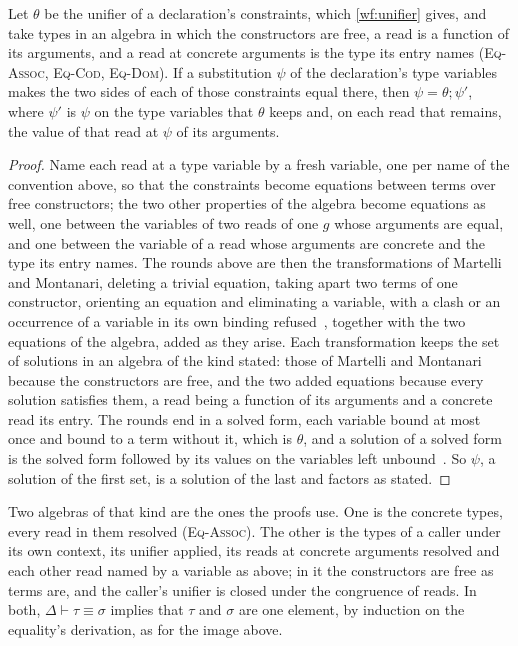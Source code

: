 \begin{lemma}[Factoring]
\label{lem:factor}
Let $\theta$ be the unifier of a declaration's  constraints, which \ref{wf:unifier} gives, and take types in an algebra in which the constructors are free, a read is a function of its arguments, and a read at concrete arguments is the type its entry names (\textsc{Eq-Assoc}, \textsc{Eq-Cod}, \textsc{Eq-Dom}).
If a substitution $\psi$ of the declaration's type variables makes the two sides of each of those constraints equal there, then $\psi = \theta;\psi'$, where $\psi'$ is $\psi$ on the type variables that $\theta$ keeps and, on each read that remains, the value of that read at $\psi$ of its arguments.
\end{lemma}
\begin{proof}
Name each read at a type variable by a fresh variable, one per name of the convention above, so that the constraints become equations between terms over free constructors; the two other properties of the algebra become equations as well, one between the variables of two reads of one $g$ whose arguments are equal, and one between the variable of a read whose arguments are concrete and the type its entry names.
The rounds above are then the transformations of Martelli and Montanari, deleting a trivial equation, taking apart two terms of one constructor, orienting an equation and eliminating a variable, with a clash or an occurrence of a variable in its own binding refused~\cite{martelli1982efficient,baader2001unification}, together with the two equations of the algebra, added as they arise.
Each transformation keeps the set of solutions in an algebra of the kind stated: those of Martelli and Montanari because the constructors are free, and the two added equations because every solution satisfies them, a read being a function of its arguments and a concrete read its entry.
The rounds end in a solved form, each variable bound at most once and bound to a term without it, which is $\theta$, and a solution of a solved form is the solved form followed by its values on the variables left unbound~\cite[Chapter~4]{baader1998term}.
So $\psi$, a solution of the first set, is a solution of the last and factors as stated.
\end{proof}

Two algebras of that kind are the ones the proofs use.
One is the concrete types, every read in them resolved (\textsc{Eq-Assoc}).
The other is the types of a caller under its own context, its unifier applied, its reads at concrete arguments resolved and each other read named by a variable as above; in it the constructors are free as terms are, and the caller's unifier is closed under the congruence of reads.
In both, $\Delta \vdash \tau \equiv \sigma$ implies that $\tau$ and $\sigma$ are one element, by induction on the equality's derivation, as for the image above.

